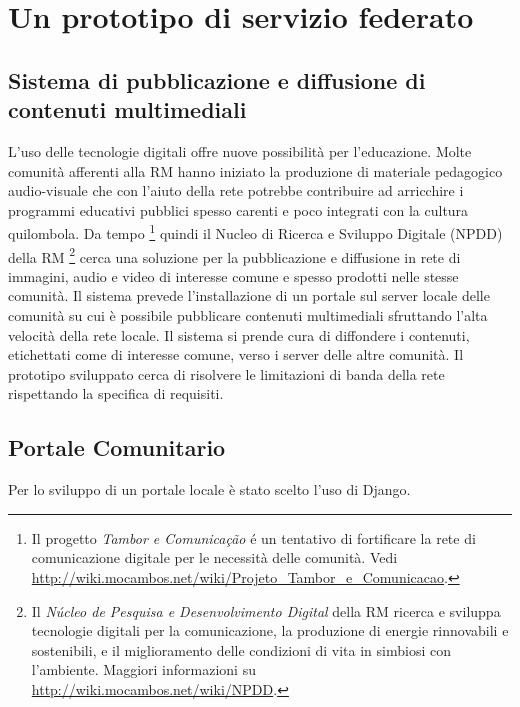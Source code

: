 
\chapter{Un prototipo di servizio federato}
\label{Capitolo3}

\section{Sistema di pubblicazione e diffusione di contenuti
  multimediali}
L'uso delle tecnologie digitali offre nuove possibilità per
l'educazione. Molte comunità afferenti alla RM hanno iniziato la
produzione di materiale pedagogico audio-visuale che con l'aiuto della
rete potrebbe contribuire ad arricchire i programmi educativi pubblici
spesso carenti e poco integrati con la cultura quilombola. Da tempo
\footnote{Il progetto \emph{Tambor e Comunicação} é un tentativo di
  fortificare la rete di comunicazione digitale per le necessità delle
  comunità. Vedi
  \url{http://wiki.mocambos.net/wiki/Projeto_Tambor_e_Comunicacao}.}
quindi il Nucleo di Ricerca e Sviluppo Digitale (NPDD) della RM
\footnote{Il \emph{Núcleo de Pesquisa e Desenvolvimento Digital} della
  RM ricerca e sviluppa tecnologie digitali per la comunicazione, la
  produzione di energie rinnovabili e sostenibili, e il miglioramento
  delle condizioni di vita in simbiosi con l'ambiente. Maggiori
  informazioni su \url{http://wiki.mocambos.net/wiki/NPDD}.} cerca una
soluzione per la pubblicazione e diffusione in rete di immagini, audio
e video di interesse comune e spesso prodotti nelle stesse
comunità. Il sistema prevede l'installazione di un portale sul server
locale delle comunità su cui è possibile pubblicare contenuti
multimediali sfruttando l'alta velocità della rete locale. Il sistema
si prende cura di diffondere i contenuti, etichettati come di
interesse comune, verso i server delle altre comunità. Il prototipo
sviluppato cerca di risolvere le limitazioni di banda della rete
rispettando la specifica di requisiti.

\section{Portale Comunitario}
Per lo sviluppo di un portale locale è stato scelto l'uso di Django.


